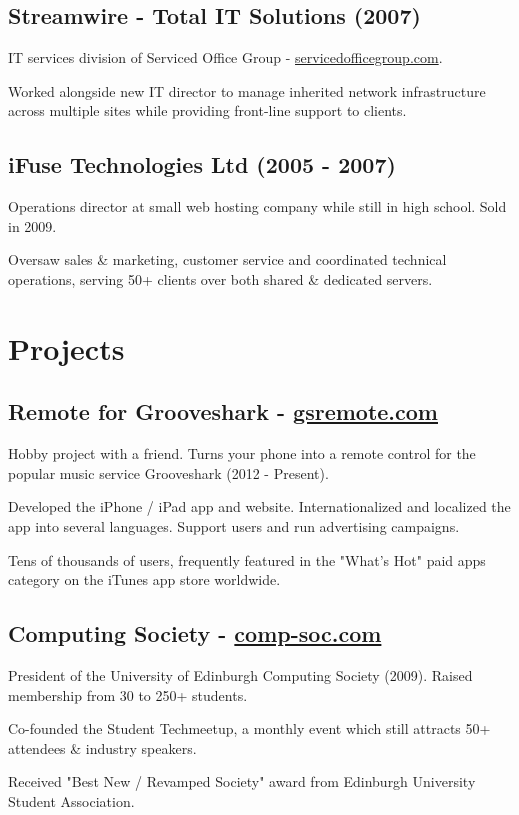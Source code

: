 \documentclass[a4paper]{article}
\renewenvironment{itemize}{
  \begin{list}{}{
    \setlength{\leftmargin}{1.5em}
  }
}{
  \end{list}
}
\begin{document}
\subsection*{Streamwire - Total IT Solutions (2007)}
\begin{itemize}
  \item IT services division of Serviced Office Group - \href{http://servicedofficegroup.com}{servicedofficegroup.com}.
  \item Worked alongside new IT director to manage inherited network infrastructure across multiple sites while providing front-line support to clients.
\end{itemize}

\subsection*{iFuse Technologies Ltd (2005 - 2007)}
\begin{itemize}
  \item Operations director at small web hosting company while still in high school. Sold in 2009.
  \item Oversaw sales \& marketing, customer service and coordinated technical operations, serving 50+ clients over both shared \& dedicated servers.
\end{itemize}

\section*{Projects}

\subsection*{Remote for Grooveshark - \href{http://gsremote.com}{gsremote.com}}
\begin{itemize}
\item Hobby project with a friend. Turns your phone into a remote control for the popular music service Grooveshark (2012 - Present).
\item Developed the iPhone / iPad app and website. Internationalized and localized the app into several languages. Support users and run advertising campaigns.
\item Tens of thousands of users, frequently featured in the "What's Hot" paid apps category on the iTunes app store worldwide.
\end{itemize}

\subsection*{Computing Society - \href{http://comp-soc.com}{comp-soc.com}}
\begin{itemize}
\item President of the University of Edinburgh Computing Society (2009). Raised membership from 30 to 250+ students.
\item Co-founded the Student Techmeetup, a monthly event which still attracts 50+ attendees \& industry speakers.
\item Received "Best New / Revamped Society" award from Edinburgh University Student Association.
\end{itemize}
\end{document}
